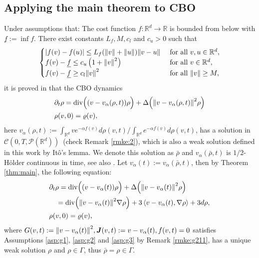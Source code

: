 \documentclass[a4paper, 11pt]{article}
\newcommand{\inner}[2]{\left< #1 , #2 \right>}
\theoremstyle{plain}
\theoremstyle{remark}
\theoremstyle{definition}
\renewcommand{\div}{\mathrm{div}}
\newcommand{\intd}{\int_{\mathbb{R}^d}}
\newcommand{\J}{\boldsymbol{J}}
\begin{document}
\subsection{Applying the main theorem to CBO}\label{sec:cbo}
Under assumptions that: The cost function $f: \mathbb{R}^d \rightarrow \mathbb{R}$ is bounded from below with $\underline{f}:=\inf f$. There exist constants $L_f,M,c_l$ and $c_u>0$ such that
\begin{equation}\label{condition:f}
    \begin{cases}|f(v)-f(u)| \leq L_f(\norm{v}+\norm{u})\norm{v-u} & \text { for all } v, u \in \mathbb{R}^d, \\ f(v)-\underline{f} \leq c_u\left(1+\norm{v}^2\right) & \text { for all } v\in \mathbb{R}^d ,\\
f(v)-\underline{f}\geq c_l\norm{v}^2& \text { for all } \norm{v}\geq M, \end{cases}
\end{equation}
it is proved in \cite[Theorem 3.2]{carrillo2018analytical} that the CBO dynamics
\begin{equation}\label{eq:gcbo}
		\begin{aligned}
			&\partial_t\rho=\div\Big((v-v_\alpha(\rho,t))\rho\Big)+\Delta\Big(\norm{v-v_\alpha(\rho,t)}^2\rho\Big)\\
			&\rho(v,0)=\varrho(v),
		\end{aligned}
	\end{equation}
    here $v_\alpha(\rho,t):=\intd ve^{-\alpha f(v)}d\rho(v,t)/\intd e^{-\alpha f(v)}d\rho(v,t)$,
    has a solution in $\mathcal{C}(0,T,\mathcal{P}(\mathbb{R}^d))$~(check Remark \ref{rmke:2}), which is also a weak solution defined in this work by It\^o's lemma. We denote this solution as $\bar{\rho}$ and $v_\alpha(\bar{\rho},t)$ is $1/2$-H\"older continuous in time, see also \cite[Theorem 3.2]{carrillo2018analytical}.
 Let $v_\alpha(t):=v_\alpha(\bar{\rho},t)$, then by Theorem \ref{thm:main}, the following equation:
	\begin{equation}
		\begin{aligned}
			&\partial_t\rho=\div\Big((v-v_\alpha(t))\rho\Big)+\Delta\Big(\norm{v-v_\alpha(t)}^2\rho\Big)\\
			&\quad=\div\Big(\norm{v-v_\alpha(t)}^2\nabla\rho\Big)+3\inner{v-v_\alpha(t)}{\nabla\rho}+3d\rho,\\
			&\rho(v,0)=\varrho(v),
		\end{aligned}
	\end{equation}
    where $G(v,t):=\norm{v-v_\alpha(t)}^2,\J(v,t):=v-v_\alpha(t),f(v,t)=0$ satisfies Assumptions \ref{asp:g1}, \ref{asp:g2} and \ref{asp:g3} by Remark \ref{rmke:g211}, has a unique weak solution $\rho$ and $\rho\in\Gamma$, thus $\bar{\rho}=\rho\in\Gamma$.
\end{document}
